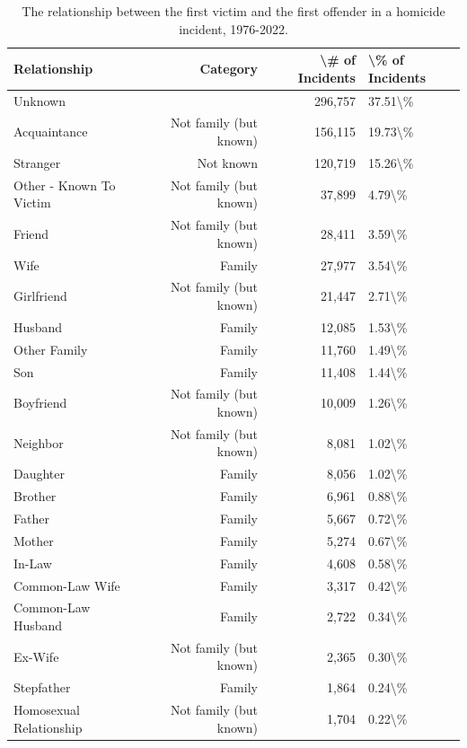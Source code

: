 \documentclass[
  12pt,
  openany]{book}
\begin{document}
\begin{longtable}[t]{lrrl}
\caption{\label{tab:shrRelationship}The relationship between the first victim and the first offender in a homicide incident, 1976-2022.}\\
\toprule
Relationship & Category & \textbackslash{}\# of Incidents & \textbackslash{}\% of Incidents\\
\midrule
Unknown &  & 296,757 & 37.51\textbackslash{}\%\\
Acquaintance & Not family (but known) & 156,115 & 19.73\textbackslash{}\%\\
Stranger & Not known & 120,719 & 15.26\textbackslash{}\%\\
Other - Known To Victim & Not family (but known) & 37,899 & 4.79\textbackslash{}\%\\
Friend & Not family (but known) & 28,411 & 3.59\textbackslash{}\%\\
\addlinespace
Wife & Family & 27,977 & 3.54\textbackslash{}\%\\
Girlfriend & Not family (but known) & 21,447 & 2.71\textbackslash{}\%\\
Husband & Family & 12,085 & 1.53\textbackslash{}\%\\
Other Family & Family & 11,760 & 1.49\textbackslash{}\%\\
Son & Family & 11,408 & 1.44\textbackslash{}\%\\
\addlinespace
Boyfriend & Not family (but known) & 10,009 & 1.26\textbackslash{}\%\\
Neighbor & Not family (but known) & 8,081 & 1.02\textbackslash{}\%\\
Daughter & Family & 8,056 & 1.02\textbackslash{}\%\\
Brother & Family & 6,961 & 0.88\textbackslash{}\%\\
Father & Family & 5,667 & 0.72\textbackslash{}\%\\
\addlinespace
Mother & Family & 5,274 & 0.67\textbackslash{}\%\\
In-Law & Family & 4,608 & 0.58\textbackslash{}\%\\
Common-Law Wife & Family & 3,317 & 0.42\textbackslash{}\%\\
Common-Law Husband & Family & 2,722 & 0.34\textbackslash{}\%\\
Ex-Wife & Not family (but known) & 2,365 & 0.30\textbackslash{}\%\\
\addlinespace
Stepfather & Family & 1,864 & 0.24\textbackslash{}\%\\
Homosexual Relationship & Not family (but known) & 1,704 & 0.22\textbackslash{}\%\\

\end{longtable}
\end{document}
